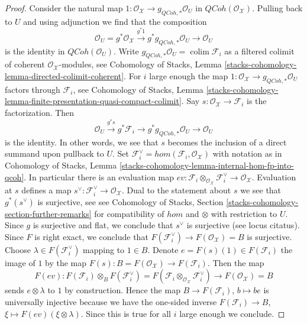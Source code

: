 \documentclass[10pt,a4paper]{amsart}
\theoremstyle{plain}
\theoremstyle{definition}
\theoremstyle{remark}
\numberwithin{equation}{subsection}
\def\colim{\mathop{\mathrm{colim}}\nolimits}
\def\QCoh{\mathit{QCoh}}
\begin{document}
\begin{proof}
Consider the natural map
$1 : \mathcal{O}_\mathcal{X} \to g_{\QCoh, *}\mathcal{O}_U$
in $\QCoh(\mathcal{O}_\mathcal{X})$. Pulling back to $U$ and
using adjunction we find that the composition
$$
\mathcal{O}_U =
g^*\mathcal{O}_\mathcal{X} \xrightarrow{g^*1}
g^*g_{\QCoh, *}\mathcal{O}_U \to \mathcal{O}_U
$$
is the identity in $\QCoh(\mathcal{O}_U)$.
Write $g_{\QCoh, *}\mathcal{O}_U = \colim \mathcal{F}_i$
as a filtered colimit of coherent $\mathcal{O}_\mathcal{X}$-modules, see
Cohomology of Stacks, Lemma
\ref{stacks-cohomology-lemma-directed-colimit-coherent}.
For $i$ large enough the map
$1 : \mathcal{O}_\mathcal{X} \to g_{\QCoh, *}\mathcal{O}_U$
factors through $\mathcal{F}_i$, see
Cohomology of Stacks, Lemma
\ref{stacks-cohomology-lemma-finite-presentation-quasi-compact-colimit}.
Say $s : \mathcal{O}_\mathcal{X} \to \mathcal{F}_i$ is the
factorization. Then
$$
\mathcal{O}_U \xrightarrow{g^*s} g^*\mathcal{F}_i \to
g^*g_{\QCoh, *}\mathcal{O}_U \to \mathcal{O}_U
$$
is the identity. In other words, we see that $s$ becomes the
inclusion of a direct summand upon pullback to $U$. Set
$\mathcal{F}_i^\vee = hom(\mathcal{F}_i, \mathcal{O}_\mathcal{X})$
with notation as in
Cohomology of Stacks, Lemma
\ref{stacks-cohomology-lemma-internal-hom-fp-into-qcoh}.
In particular there is an evaluation map
$ev : \mathcal{F}_i \otimes_{\mathcal{O}_\mathcal{X}} \mathcal{F}_i^\vee
\to \mathcal{O}_\mathcal{X}$.
Evaluation at $s$ defines a map
$s^\vee : \mathcal{F}_i^\vee \to \mathcal{O}_\mathcal{X}$.
Dual to the statement about $s$ we see that $g^*(s^\vee)$ is surjective, see
see Cohomology of Stacks, Section
\ref{stacks-cohomology-section-further-remarks}
for compatibility of $hom$ and $\otimes$ with restriction to $U$.
Since $g$ is surjective and flat, we conclude that $s^\vee$ is surjective
(see locus citatus). Since $F$ is right exact, we conclude that
$F(\mathcal{F}_i^\vee) \to F(\mathcal{O}_\mathcal{X}) = B$ is surjective.
Choose $\lambda \in F(\mathcal{F}_i^\vee)$
mapping to $1 \in B$. Denote $e = F(s)(1) \in F(\mathcal{F}_i)$
the image of $1$ by the map
$F(s) : B = F(\mathcal{O}_\mathcal{X}) \to F(\mathcal{F}_i)$.
Then the map
$$
F(ev) :
F(\mathcal{F}_i) \otimes_B F(\mathcal{F}_i^\vee) =
F(\mathcal{F}_i \otimes_{\mathcal{O}_\mathcal{X}} \mathcal{F}_i^\vee)
\longrightarrow
F(\mathcal{O}_\mathcal{X}) = B
$$
sends $e \otimes \lambda$ to $1$ by construction. Hence the
map $B \to F(\mathcal{F}_i)$, $b \mapsto be$
is universally injective because we have the one-sided
inverse $F(\mathcal{F}_i) \to B$, $\xi \mapsto F(ev)(\xi \otimes \lambda)$.
Since this is true for all $i$ large enough we conclude.
\end{proof}
\end{document}
